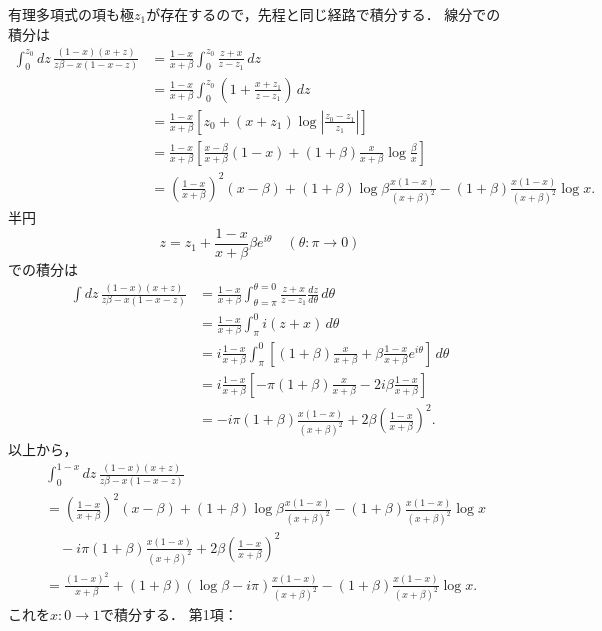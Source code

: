 有理多項式の項も極$z_1$が存在するので，先程と同じ経路で積分する．
線分での積分は
\begin{align*}
  \int_0^{z_0} dz \, \frac{(1-x)(x+z)}{z\beta - x(1-x-z)}
  &= \frac{1-x}{x+\beta} \int_0^{z_0} \frac{z+x}{z-z_1} \, dz \\
  &= \frac{1-x}{x+\beta} \int_0^{z_0} \left( 1 + \frac{x+z_1}{z-z_1} \right) \,  dz \\
  &= \frac{1-x}{x+\beta} \left[ z_0 + (x+z_1) \log \left\lvert \frac{z_0-z_1}{z_1} \right\rvert \right] \\
  &= \frac{1-x}{x+\beta} \left[ \frac{x-\beta}{x+\beta}(1-x) + (1+\beta) \frac{x}{x+\beta} \log \frac{\beta}{x} \right] \\
  &= \left( \frac{1-x}{x+\beta} \right)^2 (x-\beta)
  + (1+\beta)\log \beta \frac{x(1-x)}{(x+\beta)^2}
  - (1+\beta) \frac{x(1-x)}{(x+\beta)^2} \log x .
\end{align*}
半円
\[z = z_1 + \frac{1-x}{x+\beta} \beta e^{i\theta} \quad (\theta \colon \pi \to 0) \]
での積分は
\begin{align*}
  \int dz \, \frac{(1-x)(x+z)}{z\beta - x(1-x-z)}
  &= \frac{1-x}{x+\beta} \int_{\theta=\pi}^{\theta=0} \frac{z+x}{z-z_1} \frac{dz}{d\theta} \, d\theta \\
  &= \frac{1-x}{x+\beta} \int_\pi^0 i (z+x) \, d\theta \\
  &= i \frac{1-x}{x+\beta} \int_\pi^0 \left[ (1+\beta) \frac{x}{x+\beta} + \beta \frac{1-x}{x+\beta} e^{i\theta} \right] \, d\theta \\
  &= i \frac{1-x}{x+\beta} \left[ - \pi (1+\beta) \frac{x}{x+\beta} - 2i \beta \frac{1-x}{x+\beta} \right] \\
  &= - i \pi (1+\beta) \frac{x(1-x)}{(x+\beta)^2} + 2\beta \left( \frac{1-x}{x+\beta} \right)^2 .
\end{align*}
以上から，
\begin{align*}
  & \int_0^{1-x} dz \, \frac{(1-x)(x+z)}{z\beta - x(1-x-z)} \\
  &= \left( \frac{1-x}{x+\beta} \right)^2 (x-\beta)
  + (1+\beta)\log \beta \frac{x(1-x)}{(x+\beta)^2}
  - (1+\beta) \frac{x(1-x)}{(x+\beta)^2} \log x \\
  & \quad - i \pi (1+\beta) \frac{x(1-x)}{(x+\beta)^2} + 2\beta \left( \frac{1-x}{x+\beta} \right)^2 \\
  &= \frac{(1-x)^2}{x+\beta} + (1+\beta)(\log\beta - i\pi) \frac{x(1-x)}{(x+\beta)^2} - (1+\beta) \frac{x(1-x)}{(x+\beta)^2} \log x .
\end{align*}
これを$x \colon 0 \to 1$で積分する．
第1項：
